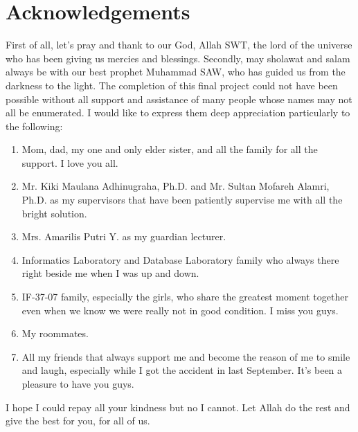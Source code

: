 \chapter*{Acknowledgements}

First of all, let's pray and thank to our God, Allah SWT, the lord of the universe who has been giving us mercies and blessings. Secondly, may sholawat and salam always be with our best prophet Muhammad SAW, who has guided us from the darkness to the light. The completion of this final project could not have been possible without all support and assistance of many people whose names may not all be enumerated. I would like to express them deep appreciation particularly to the following:

\begin{enumerate}
	\item Mom, dad, my one and only elder sister, and all the family for all the support. I love you all.
	\item Mr. Kiki Maulana Adhinugraha, Ph.D. and Mr. Sultan Mofareh Alamri, Ph.D. as my supervisors that have been patiently supervise me with all the bright solution.
	\item Mrs. Amarilis Putri Y. as my guardian lecturer.
	\item Informatics Laboratory and Database Laboratory family who always there right beside me when I was up and down.
	\item IF-37-07 family, especially the girls, who share the greatest moment together even when we know we were really not in good condition. I miss you guys.
	\item My roommates.
	\item All my friends that always support me and become the reason of me to smile and laugh, especially while I got the accident in last September. It's been a pleasure to have you guys. 
\end{enumerate}

I hope I could repay all your kindness but no I cannot. Let Allah do the rest and give the best for you, for all of us.